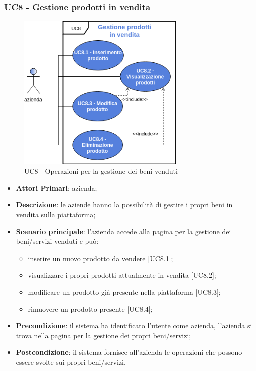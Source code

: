 \subsubsection{UC8 - Gestione prodotti in vendita}
\begin{figure}[h]
	\includegraphics[width=8cm]{res/images/UC8-Generale.png}
	\centering
	\caption{UC8 - Operazioni per la gestione dei beni venduti}
\end{figure}
\begin{itemize}
	\item \textbf{Attori Primari}: azienda;
	\item \textbf{Descrizione}: le aziende hanno la possibilità di gestire i propri beni in vendita sulla piattaforma;
	\item \textbf{Scenario principale}: l'azienda accede alla pagina per la gestione dei beni/servizi venduti e può:
	\begin{itemize}
		\item inserire un nuovo prodotto da vendere [UC8.1];
		\item visualizzare i propri prodotti attualmente in vendita [UC8.2];
		\item modificare un prodotto già presente nella piattaforma [UC8.3];
		\item rimuovere un prodotto presente [UC8.4]; 
	\end{itemize}
	\item \textbf{Precondizione}: il sistema ha identificato l'utente come azienda, l'azienda si trova nella pagina per la gestione dei propri beni/servizi;
	\item \textbf{Postcondizione}: il sistema fornisce all'azienda le operazioni che possono essere svolte sui propri beni/servizi.	
\end{itemize}

